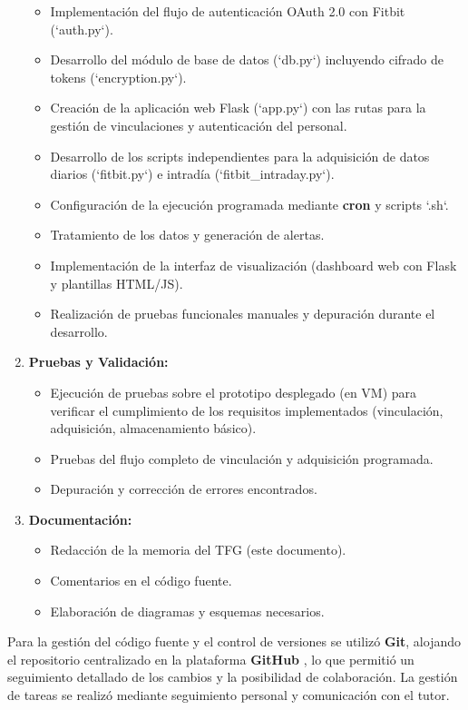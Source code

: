 \begin{enumerate}
\begin{itemize}
            \item Implementación del flujo de autenticación OAuth 2.0 con Fitbit\textsuperscript{\textregistered} (`auth.py`).
            \item Desarrollo del módulo de base de datos (`db.py`) incluyendo cifrado de tokens (`encryption.py`).
            \item Creación de la aplicación web Flask (`app.py`) con las rutas para la gestión de vinculaciones y autenticación del personal.
            \item Desarrollo de los scripts independientes para la adquisición de datos diarios (`fitbit.py`) e intradía (`fitbit\_intraday.py`).
            \item Configuración de la ejecución programada mediante \textbf{cron} y scripts `.sh`.
            \item Tratamiento de los datos y generación de alertas.
            \item Implementación de la interfaz de visualización (dashboard web con Flask y plantillas HTML/JS).
            \item Realización de pruebas funcionales manuales y depuración durante el desarrollo.
        \end{itemize}
    \item \textbf{Pruebas y Validación:}
        \begin{itemize}
            \item Ejecución de pruebas sobre el prototipo desplegado (en VM) para verificar el cumplimiento de los requisitos implementados (vinculación, adquisición, almacenamiento básico).
            \item Pruebas del flujo completo de vinculación y adquisición programada.
            \item Depuración y corrección de errores encontrados.
        \end{itemize}
    \item \textbf{Documentación:}
        \begin{itemize}
            \item Redacción de la memoria del TFG (este documento).
            \item Comentarios en el código fuente.
            \item Elaboración de diagramas y esquemas necesarios.
        \end{itemize}
\end{enumerate}

Para la gestión del código fuente y el control de versiones se utilizó \textbf{Git}, alojando el repositorio centralizado en la plataforma \textbf{GitHub} \cite{github_repo_proyecto}, lo que permitió un seguimiento detallado de los cambios y la posibilidad de colaboración. La gestión de tareas se realizó mediante seguimiento personal y comunicación con el tutor.


